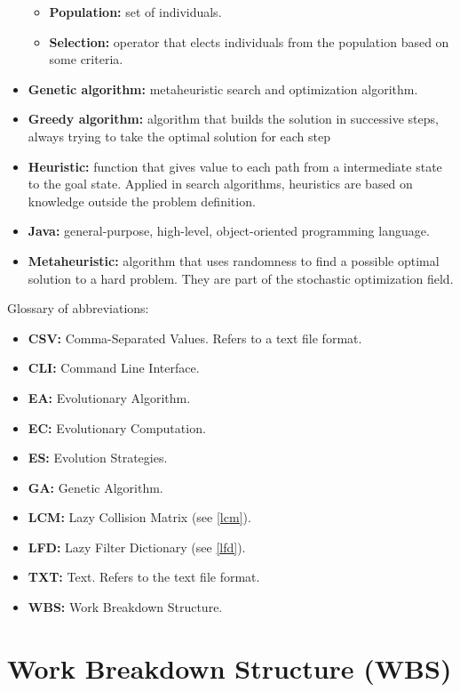 \begin{itemize}
\begin{itemize}
            \item \textbf{Population:} set of individuals.
            \item \textbf{Selection:} operator that elects individuals from the population based on some criteria.
        \end{itemize}
    \item \textbf{Genetic algorithm:} metaheuristic search and optimization algorithm. 
    \item \textbf{Greedy algorithm:} algorithm that builds the solution in successive steps, always trying to take the optimal solution for each step
    \item \textbf{Heuristic:} function that gives value to each path from a intermediate state to the goal state. Applied in search algorithms, heuristics are based on knowledge outside the problem definition.
    \item \textbf{Java:} general-purpose, high-level, object-oriented programming language.
    \item \textbf{Metaheuristic:} algorithm that uses randomness to find a possible optimal solution to a hard problem. They are part of the stochastic optimization field.
\end{itemize}

Glossary of abbreviations:

\begin{itemize}
    \item \textbf{CSV:} Comma-Separated Values. Refers to a text file format.
    \item \textbf{CLI:} Command Line Interface.
    \item \textbf{EA:} Evolutionary Algorithm.
    \item \textbf{EC:} Evolutionary Computation.
    \item \textbf{ES:} Evolution Strategies.
    \item \textbf{GA:} Genetic Algorithm.
    \item \textbf{LCM:} Lazy Collision Matrix (see \ref{lcm}).
    \item \textbf{LFD:} Lazy Filter Dictionary (see \ref{lfd}).
    \item \textbf{TXT:} Text. Refers to the text file format.
    \item \textbf{WBS:} Work Breakdown Structure.
\end{itemize}



\section{Work Breakdown Structure (WBS)}



